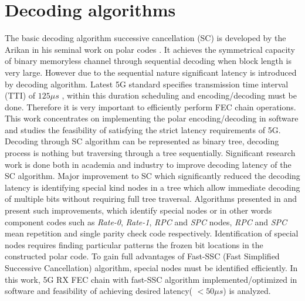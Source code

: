 
\section{Decoding algorithms}
The basic decoding algorithm successive cancellation (SC) is developed by the Arikan in his seminal work on polar codes \cite{Arikan}. It achieves the symmetrical capacity of binary memoryless channel through sequential decoding when block length is very large. However due to the sequential nature significant latency is introduced by decoding algorithm. Latest 5G standard specifies transmission time interval (TTI) of $125 \mu s$ , within this duration scheduling and encoding/decoding must be done. Therefore it is very important to efficiently perform FEC chain operations. This work concentrates on implementing the polar encoding/decoding in software and studies the feasibility of satisfying the strict latency requirements of 5G. Decoding through SC algorithm can be represented as binary tree, decoding process is nothing but traversing through a tree sequentially. Significant research work is done both in academia and industry to improve decoding latency of the SC algorithm. Major improvement to SC which significantly reduced the decoding latency is identifying special kind nodes in a tree which allow immediate decoding of multiple bits without requiring full tree traversal. Algorithms presented in \cite{SSC} and \cite{fastSSC} present such improvements, which identify special nodes or in other words component codes such as \textit{Rate-0}, \textit{Rate-1}, \textit{RPC} and \textit{SPC} nodes, \textit{RPC} and \textit{SPC} mean repetition and single parity check code respectively. Identification of special nodes requires finding particular patterns the frozen bit locations in the constructed polar code. To gain full advantages of Fast-SSC (Fast Simplified Successive Cancellation) algorithm, special nodes must be identified efficiently. In this work, 5G RX FEC chain with fast-SSC algorithm implemented/optimized in software and feasibility of achieving desired latency( $< 50\mu s$) is analyzed.


